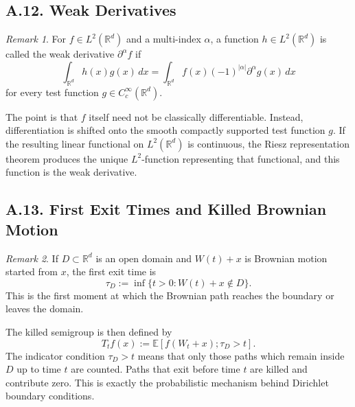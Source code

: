 \documentclass[11pt]{article}
\theoremstyle{definition}
\theoremstyle{remark}
\newtheorem{remark}{Remark}
\begin{document}
\subsection*{A.12. Weak Derivatives}
\begin{remark}
For \(f\in L^2(\mathbb R^d)\) and a multi-index \(\alpha\), a function \(h\in L^2(\mathbb R^d)\) is called the weak derivative \(\partial^\alpha f\) if
\[
\int_{\mathbb R^d} h(x)g(x)\,dx
=
\int_{\mathbb R^d} f(x)(-1)^{|\alpha|}\partial^\alpha g(x)\,dx
\]
for every test function \(g\in C_c^\infty(\mathbb R^d)\).

The point is that \(f\) itself need not be classically differentiable. Instead, differentiation is shifted onto the smooth compactly supported test function \(g\). If the resulting linear functional on \(L^2(\mathbb R^d)\) is continuous, the Riesz representation theorem produces the unique \(L^2\)-function representing that functional, and this function is the weak derivative.
\end{remark}

\subsection*{A.13. First Exit Times and Killed Brownian Motion}
\begin{remark}
If \(D\subset \mathbb R^d\) is an open domain and \(W(t)+x\) is Brownian motion started from \(x\), the first exit time is
\[
\tau_D:=\inf\{t>0:W(t)+x\notin D\}.
\]
This is the first moment at which the Brownian path reaches the boundary or leaves the domain.

The killed semigroup is then defined by
\[
T_t f(x):=\mathbb E[f(W_t+x);\tau_D>t].
\]
The indicator condition \(\tau_D>t\) means that only those paths which remain inside \(D\) up to time \(t\) are counted. Paths that exit before time \(t\) are killed and contribute zero. This is exactly the probabilistic mechanism behind Dirichlet boundary conditions.
\end{remark}
\end{document}
